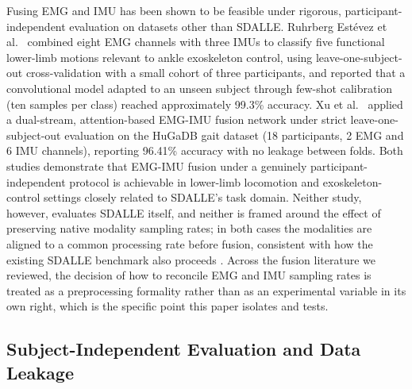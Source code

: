 \documentclass[conference]{IEEEtran}
\begin{document}
Fusing EMG and IMU has been shown to be feasible under rigorous,
participant-independent evaluation on datasets other than SDALLE.
Ruhrberg Estévez et al.~\cite{ruhrbergestevez2025ankleexo} combined
eight EMG channels with three IMUs to classify five functional
lower-limb motions relevant to ankle exoskeleton control, using
leave-one-subject-out cross-validation with a small cohort of three
participants, and reported that a convolutional model adapted to an
unseen subject through few-shot calibration (ten samples per class)
reached approximately 99.3\% accuracy. Xu et
al.~\cite{xu2026dsaf} applied a dual-stream, attention-based
EMG-IMU fusion network under strict leave-one-subject-out evaluation
on the HuGaDB gait dataset (18 participants, 2 EMG and 6 IMU
channels), reporting 96.41\% accuracy with no leakage between folds.
Both studies demonstrate that EMG-IMU fusion under a genuinely
participant-independent protocol is achievable in lower-limb
locomotion and exoskeleton-control settings closely related to
SDALLE's task domain. Neither study, however, evaluates SDALLE
itself, and neither is framed around the effect of preserving native
modality sampling rates; in both cases the modalities are aligned
to a common processing rate before fusion, consistent with how the
existing SDALLE benchmark also proceeds
\cite{farouk2026sdalle}. Across the fusion literature we reviewed,
the decision of how to reconcile EMG and IMU sampling rates is
treated as a preprocessing formality rather than as an experimental
variable in its own right, which is the specific point this paper
isolates and tests.

\subsection{Subject-Independent Evaluation and Data Leakage}
\label{subsec:leakage-related}
\end{document}

